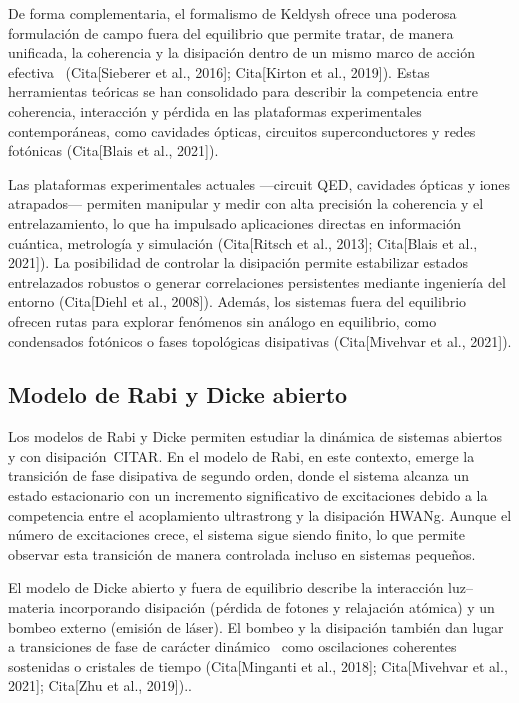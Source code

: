 \documentclass[onecolumn,notitlepage,letterpaper,aps,pra,12pt]{article}
\numberwithin{equation}{section}
\begin{document}
De forma complementaria, el formalismo de Keldysh ofrece una poderosa formulación de campo fuera del equilibrio que permite tratar, de manera unificada, la coherencia y la disipación dentro de un mismo marco de acción efectiva~\cite{Fazio2025} (Cita[Sieberer et al., 2016]; Cita[Kirton et al., 2019]). Estas herramientas teóricas se han consolidado para describir la competencia entre coherencia, interacción y pérdida en las plataformas experimentales contemporáneas, como cavidades ópticas, circuitos superconductores y redes fotónicas (Cita[Blais et al., 2021]).

Las plataformas experimentales actuales —circuit QED, cavidades ópticas y iones atrapados— permiten manipular y medir con alta precisión la coherencia y el entrelazamiento, lo que ha impulsado aplicaciones directas en información cuántica, metrología y simulación (Cita[Ritsch et al., 2013]; Cita[Blais et al., 2021]). La posibilidad de controlar la disipación permite estabilizar estados entrelazados robustos o generar correlaciones persistentes mediante ingeniería del entorno (Cita[Diehl et al., 2008]). Además, los sistemas fuera del equilibrio ofrecen rutas para explorar fenómenos sin análogo en equilibrio, como condensados fotónicos o fases topológicas disipativas (Cita[Mivehvar et al., 2021]). 

\subsection{Modelo de Rabi y Dicke abierto}

Los modelos de Rabi y Dicke permiten estudiar la dinámica de sistemas abiertos y con disipación~CITAR. En el modelo de Rabi, en este contexto, emerge la transición de fase disipativa de segundo orden, donde el sistema alcanza un estado estacionario con un incremento significativo de excitaciones debido a la competencia entre el acoplamiento ultrastrong y la disipación HWANg. Aunque el número de excitaciones crece, el sistema sigue siendo finito, lo que permite observar esta transición de manera controlada incluso en sistemas pequeños.

El modelo de Dicke abierto y fuera de equilibrio describe la interacción luz–materia incorporando disipación (pérdida de fotones y relajación atómica) y un bombeo externo (emisión de láser). El bombeo y la disipación también dan lugar a transiciones de fase de carácter dinámico~\cite{kirton2017,LeBoite2020} como oscilaciones coherentes sostenidas o cristales de tiempo (Cita[Minganti et al., 2018]; Cita[Mivehvar et al., 2021]; Cita[Zhu et al., 2019])..
\end{document}
